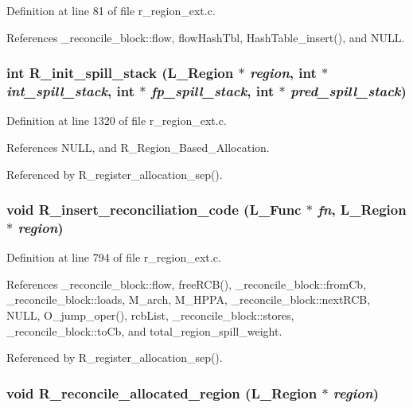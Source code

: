 Definition at line 81 of file r\_\-region\_\-ext.c.

References \_\-reconcile\_\-block::flow, flow\-Hash\-Tbl, Hash\-Table\_\-insert(), and NULL.
\subsubsection{\setlength{\rightskip}{0pt plus 5cm}int R\_\-init\_\-spill\_\-stack (L\_\-Region $\ast$ {\em region}, int $\ast$ {\em int\_\-spill\_\-stack}, int $\ast$ {\em fp\_\-spill\_\-stack}, int $\ast$ {\em pred\_\-spill\_\-stack})}\label{r__region__ext_8c_a4880df10f8f65157e8e51cd932fd886}




Definition at line 1320 of file r\_\-region\_\-ext.c.

References NULL, and R\_\-Region\_\-Based\_\-Allocation.

Referenced by R\_\-register\_\-allocation\_\-sep().
\subsubsection{\setlength{\rightskip}{0pt plus 5cm}void R\_\-insert\_\-reconciliation\_\-code (L\_\-Func $\ast$ {\em fn}, L\_\-Region $\ast$ {\em region})}\label{r__region__ext_8c_4a556d724e13a9ce25cb9421e5ef1cf7}




Definition at line 794 of file r\_\-region\_\-ext.c.

References \_\-reconcile\_\-block::flow, free\-RCB(), \_\-reconcile\_\-block::from\-Cb, \_\-reconcile\_\-block::loads, M\_\-arch, M\_\-HPPA, \_\-reconcile\_\-block::next\-RCB, NULL, O\_\-jump\_\-oper(), rcb\-List, \_\-reconcile\_\-block::stores, \_\-reconcile\_\-block::to\-Cb, and total\_\-region\_\-spill\_\-weight.

Referenced by R\_\-register\_\-allocation\_\-sep().
\subsubsection{\setlength{\rightskip}{0pt plus 5cm}void R\_\-reconcile\_\-allocated\_\-region (L\_\-Region $\ast$ {\em region})}\label{r__region__ext_8c_1154fdec77ea05ee168b3ae6d7f7b843}




